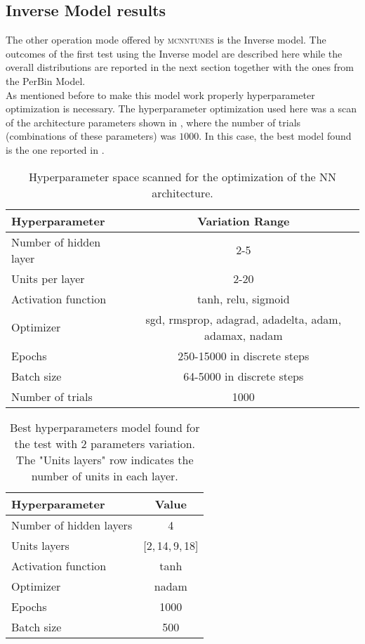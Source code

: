 \clearpage
\subsection{Inverse Model results}

The other operation mode offered by \textsc{mcnntunes} is the Inverse model. 
The outcomes of the first test using the Inverse model are described here while the overall distributions are reported in the next section together with the ones from the PerBin Model. 
\\
As mentioned before to make this model work properly hyperparameter optimization is necessary. The hyperparameter optimization used here was a scan of the architecture parameters shown in , where the number of trials (combinations of these parameters) was $1000$. In this case, the best model found is the one reported in .
\begin{table}[!htb]
	\centering
	\begin{tabular}{| l | c |}
	\hline
	Hyperparameter & Variation Range\\[2pt]\hline
	Number of hidden layer & 2-5 \\[2pt]
	Units per layer & 2-20 \\[2pt]
	Activation function & tanh, relu, sigmoid \\[2pt]
	Optimizer & {\small sgd, rmsprop, adagrad, adadelta, adam, adamax, nadam}\\[2pt]
	Epochs & 250-15000 in discrete steps\\[2pt]
	Batch size & 64-5000 in discrete steps\\[2pt] \hline
	Number of trials & 1000\\[2pt]\hline
	\end{tabular}
	\caption{Hyperparameter space scanned for the optimization of the NN architecture.}
	\label{table:hyperpar_MinBias_2par}
\end{table}


\begin{table}[!htb]
	\centering
	\begin{tabular}{ l | c }
	Hyperparameter & Value\\[2pt]\hline\hline
	Number of hidden layers & 4 \\[2pt]
	Units layers & [2,\,14,\,9,\,18] \\[2pt]
	Activation function & tanh \\[2pt]
	Optimizer & nadam\\[2pt]
	Epochs & 1000\\[2pt]
	Batch size & 500\\[2pt]
	\end{tabular}
	\caption{Best hyperparameters model found for the test with 2 parameters variation. The "Units layers" row indicates the number of units in each layer.}
	\label{table:hyperpar_2parTEST}
\end{table}

